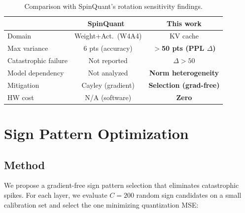 \documentclass[conference]{IEEEtran}
\begin{document}
\begin{table}[t]
\centering
\caption{Comparison with SpinQuant's rotation sensitivity findings.}
\label{tab:spinquant}
\setlength{\tabcolsep}{3pt}
\footnotesize
\begin{tabular}{lcc}
\toprule
& \textbf{SpinQuant~\cite{spinquant}} & \textbf{This work} \\
\midrule
Domain & Weight+Act.\ (W4A4) & KV cache \\
Max variance & 6 pts (accuracy) & \textbf{$>$50 pts (PPL $\Delta$)} \\
Catastrophic failure & Not reported & \textbf{$\Delta > 50$} \\
Model dependency & Not analyzed & \textbf{Norm heterogeneity} \\
Mitigation & Cayley (gradient) & \textbf{Selection (grad-free)} \\
HW cost & N/A (software) & \textbf{Zero} \\
\bottomrule
\end{tabular}
\end{table}

\section{Sign Pattern Optimization}
\label{sec:mitigation}

\subsection{Method}
We propose a gradient-free sign pattern selection that eliminates catastrophic spikes.
For each layer, we evaluate $C{=}200$ random sign candidates on a small calibration set and select the one minimizing quantization MSE:
\end{document}
